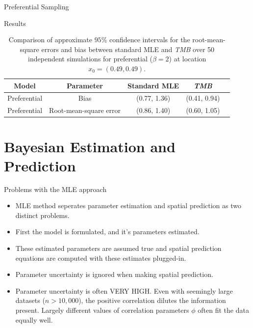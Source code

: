 \documentclass{beamer}
\begin{document}
\begin{frame}{Preferential Sampling}
\begin{block}{Results}
\small
\begin{table}[ht]
\centering
    \begin{tabular}{| c | c | c | c | c |}
    \hline
    Model & Parameter  & Standard MLE & {\it TMB} \\ \hline
    Preferential & Bias & (0.77, 1.36)  & (0.41, 0.94) \\
    Preferential & Root-mean-square error & (0.86, 1.40) & (0.60, 1.05)  \\ \hline
\end{tabular}
    \caption {Comparison of approximate $95\%$ confidence intervals for the root-mean-square errors and bias between standard MLE and {\it TMB} over 50 independent simulations for preferential ($\beta=2$) at location $x_0=(0.49, 0.49)$.}
 \label{table:simtable}
\end{table}
\normalsize
\end{block}

\end{frame}

\section{Bayesian Estimation and Prediction}

\begin{frame}{Problems with the MLE approach}

\begin{itemize}
\item MLE method seperates parameter estimation and spatial prediction as two distinct problems.
\item First the model is formulated, and it's parameters estimated.
\item These estimated parameters are assumed true and spatial prediction equations are computed with these estimates plugged-in.
\item Parameter uncertainty is ignored when making spatial prediction.
\item Parameter uncertainty is often VERY HIGH. Even with seemingly large datasets ($n > 10,000$), the positive correlation dilutes the information present. Largely different values of correlation parameters $\phi$ often fit the data equally well.
\end{itemize}

\end{frame}
\end{document}
